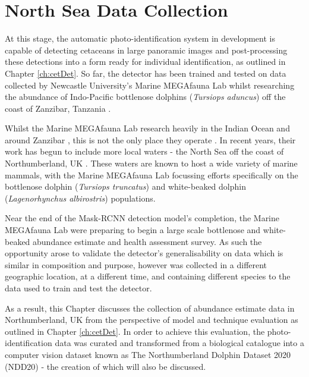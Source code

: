 \chapter{North Sea Data Collection} \label{ch:NDD}

At this stage, the automatic photo-identification system in development is capable of detecting cetaceans in large panoramic images and post-processing these detections into a form ready for individual identification, as outlined in Chapter \ref{ch:cetDet}. So far, the detector has been trained and tested on data collected by Newcastle University's Marine MEGAfauna Lab whilst researching the abundance of Indo-Pacific bottlenose dolphins (\textit{Tursiops aduncus}) off the coast of Zanzibar, Tanzania \cite{sharpe_indian_2019}. 

Whilst the Marine MEGAfauna Lab research heavily in the Indian Ocean and around Zanzibar \cite{yang_description_2020, temple_life-history_2020, temple_marine_2019, temple_marine_2018, weigmann_revision_2020, barrowclift_social_2017}, this is not the only place they operate \cite{temple_by-catch_2021, yang_classification_2017, yang_influence_2022}. In recent years, their work has begun to include more local waters - the North Sea off the coast of Northumberland, UK \cite{van_bressem_visual_2018, yang_characterization_2021}. These waters are known to host a wide variety of marine mammals, with the Marine MEGAfauna Lab focussing efforts specifically on the bottlenose dolphin (\textit{Tursiops truncatus}) and white-beaked dolphin (\textit{Lagenorhynchus albirostris}) populations. 

Near the end of the Mask-RCNN detection model's completion, the Marine MEGAfauna Lab were preparing to begin a large scale bottlenose and white-beaked abundance estimate and health assessment survey. As such the opportunity arose to validate the detector's generalisability on data which is similar in composition and purpose, however was collected in a different geographic location, at a different time, and containing different species to the data used to train and test the detector.

As a result, this Chapter discusses the collection of abundance estimate data in Northumberland, UK from the perspective of model and technique evaluation as outlined in Chapter \ref{ch:cetDet}. In order to achieve this evaluation, the photo-identification data was curated and transformed from a biological catalogue into a computer vision dataset known as The Northumberland Dolphin Dataset 2020 (NDD20) - the creation of which will also be discussed. 

